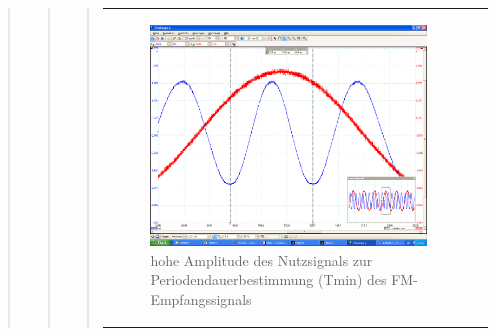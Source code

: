 \begin{quote}
\begin{quote}
\begin{quote}
\begin{center}
\begin{tabular}{ll}
            \hspace{-14em}
                \begin{minipage}{0.6\textwidth}

                    \begin{figure}[H]
                        \label{fig:}
                        \includegraphics[scale=0.5, trim = 2cm 6.5cm 1.5cm
                        8.5cm, clip]{./Bilder/aufgabe_4_12_sinus_high-ampl}
                        \caption{hohe Amplitude des Nutzsignals zur
                        Periodendauerbestimmung (Tmin) des FM-Empfangssignals}
                    \end{figure}

                \end{minipage}
                \begin{minipage}{0.6\textwidth}


\end{minipage}
\end{tabular}
\end{center}
\end{quote}
\end{quote}
\end{quote}
